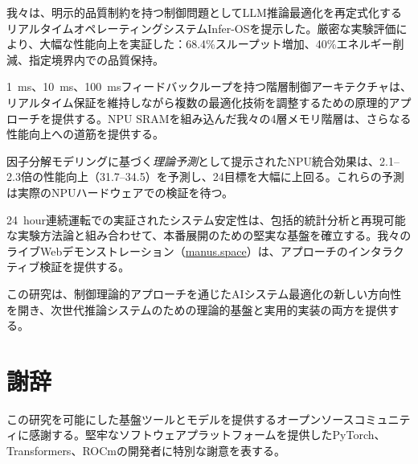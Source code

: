 \documentclass[10pt,twocolumn,a4paper]{jarticle}
\newcommand{\tps}{\text{tok/s}}
\begin{document}
我々は、明示的品質制約を持つ制御問題としてLLM推論最適化を再定式化するリアルタイムオペレーティングシステムInfer-OSを提示した。厳密な実験評価により、大幅な性能向上を実証した：68.4\%スループット増加、40\%エネルギー削減、指定境界内での品質保持。

\SI{1}{ms}、\SI{10}{ms}、\SI{100}{ms}フィードバックループを持つ階層制御アーキテクチャは、リアルタイム保証を維持しながら複数の最適化技術を調整するための原理的アプローチを提供する。NPU SRAMを組み込んだ我々の4層メモリ階層は、さらなる性能向上への道筋を提供する。

因子分解モデリングに基づく\emph{理論予測}として提示されたNPU統合効果は、2.1--2.3倍の性能向上（31.7--\SI{34.5}{\tps}）を予測し、\SI{24}{\tps}目標を大幅に上回る。これらの予測は実際のNPUハードウェアでの検証を待つ。

\SI{24}{hour}連続運転での実証されたシステム安定性は、包括的統計分析と再現可能な実験方法論と組み合わせて、本番展開のための堅実な基盤を確立する。我々のライブWebデモンストレーション（\href{https://60h5imc0l6kn.manus.space}{manus.space}）は、アプローチのインタラクティブ検証を提供する。

この研究は、制御理論的アプローチを通じたAIシステム最適化の新しい方向性を開き、次世代推論システムのための理論的基盤と実用的実装の両方を提供する。

\section*{謝辞}

この研究を可能にした基盤ツールとモデルを提供するオープンソースコミュニティに感謝する。堅牢なソフトウェアプラットフォームを提供したPyTorch、Transformers、ROCmの開発者に特別な謝意を表する。



\end{document}
